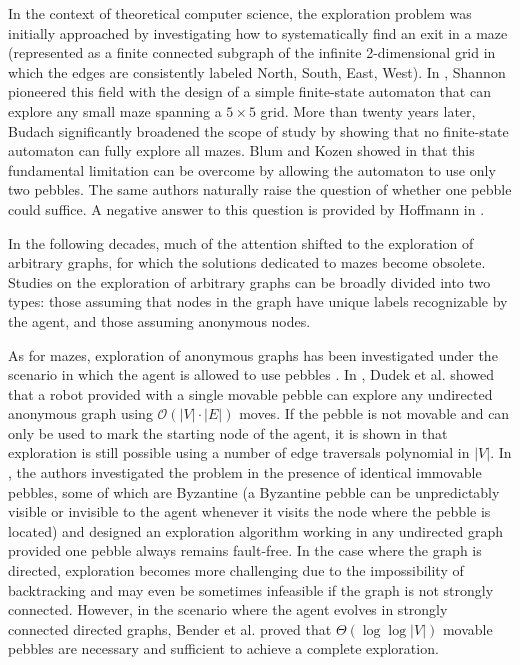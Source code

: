 \documentclass[11pt]{article}
\begin{document}
In the context of theoretical computer science, the exploration problem was initially approached by investigating how to systematically find an exit in a maze (represented as a finite connected subgraph of the infinite 2-dimensional grid in which the edges are consistently labeled North, South, East, West). In \cite{Shannon51}, Shannon pioneered this field with the design of a simple finite-state automaton that can explore any small maze spanning a $5 \times 5$ grid. More than twenty years later, Budach \cite{Budach75} significantly broadened the scope of study by showing that no finite-state automaton can fully explore all mazes. Blum and Kozen showed in \cite{BlumK78} that this fundamental limitation can be overcome by allowing the automaton to use only two pebbles. The same authors naturally raise the question of whether one pebble could suffice. A negative answer to this question is provided by Hoffmann in \cite{Hoffmann81}.

In the following decades, much of the attention shifted to the exploration of arbitrary graphs, for which the solutions dedicated to mazes become obsolete. Studies on the exploration of arbitrary graphs can be broadly divided into two types: those assuming that nodes in the graph have unique labels recognizable by the agent, and those assuming anonymous nodes.

As for mazes, exploration of anonymous graphs has been investigated
under the scenario in which the agent is allowed to use pebbles
\cite{BenderFRSV02,ChalopinDK10,DieudonneP12,DudekJMW91}. In
\cite{DudekJMW91}, Dudek et al. showed that a robot provided with a
single movable pebble can explore any undirected anonymous graph using
$\mathcal{O}(|V|\cdot|E|)$ moves. If the pebble is not movable and can
only be used to mark the starting node of the agent, it is shown in
\cite{ChalopinDK10} that exploration is still possible using a number
of edge traversals polynomial in $|V|$. In \cite{DieudonneP12}, the
authors investigated the problem in the presence of identical
immovable pebbles, some of which are Byzantine (a Byzantine pebble can
be unpredictably visible or invisible to the agent whenever it visits
the node where the pebble is located) and designed an exploration
algorithm working in any undirected graph provided one pebble always remains
 fault-free. In the case where the graph is directed,
exploration becomes more challenging due to the impossibility of
backtracking and may even be sometimes infeasible if the graph is not
strongly connected. However, in the scenario where the agent evolves
in strongly connected directed graphs, Bender et al. proved that
$\Theta(\log \log |V|)$ movable pebbles are necessary and sufficient
to achieve a complete exploration.
\end{document}
